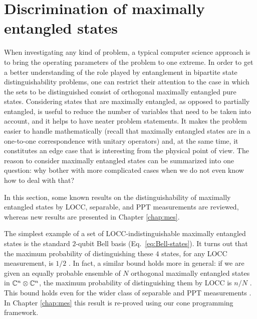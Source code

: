 


\section{Discrimination of maximally entangled states}
\label{sec:mes-intro}

When investigating any kind of problem, a typical computer science approach is 
to bring the operating parameters of the problem to one extreme.
In order to get a better understanding of the role played by entanglement in 
bipartite state distinguishability problems, one can restrict their attention to 
the case in which the sets to be distinguished consist of orthogonal 
maximally entangled pure states.
Considering states that are maximally entangled, as opposed to partially 
entangled, is useful to reduce the number of variables that need to be taken into account, and
it helps to have neater problem statements. It makes the problem easier to handle mathematically 
(recall that maximally entangled states are in a one-to-one correspondence with 
unitary operators) and, at the same time, it constitutes an edge case that is 
interesting from the physical point of view. The reason to consider maximally entangled states
can be summarized into one question: why bother with 
more complicated cases when we do not even know how to deal with that?

In this section, some known results on the distinguishability of 
maximally entangled states by LOCC, separable, and PPT measurements are reviewed,
whereas new results are presented in Chapter \ref{chap:mes}. 

The simplest example of a set of LOCC-indistinguishable maximally entangled 
states is the standard $2$-qubit Bell basis (Eq.~\eqref{eq:Bell-states}).
It turns out that the maximum probability of distinguishing these $4$ states, 
for any LOCC measurement, is $1/2$ \cite{Ghosh01}. In fact, a similar bound 
holds more in general: if we are given an equally probable ensemble of $N$ 
orthogonal maximally entangled states in $\mathbb{C}^{n}\otimes\mathbb{C}^{n}$, 
the maximum probability of distinguishing them by LOCC is $n/N$ \cite{Ghosh04}.
This bound holds even for the wider class of separable \cite{Duan09} and PPT 
measurements \cite{Yu12}. In Chapter \ref{chap:mes} this result is re-proved 
using our cone programming framework. 

